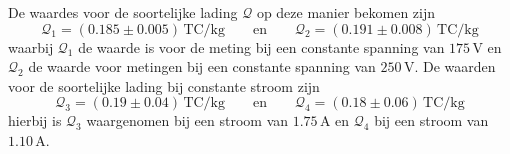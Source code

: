 De waardes voor de soortelijke lading $\mathcal{Q}$ op deze manier bekomen zijn
$$
\mathcal{Q}_1 = (0.185 \pm 0.005)\,\textrm{TC/kg}
\qquad \textrm{en} \qquad
\mathcal{Q}_2 = (0.191 \pm 0.008)\,\textrm{TC/kg}
$$
waarbij $\mathcal{Q}_1$ de waarde is voor de meting bij een constante spanning 
van $175$\,V en $\mathcal{Q}_2$ de waarde voor metingen bij een constante 
spanning van $250$\,V. De waarden voor de soortelijke lading bij constante 
stroom zijn
$$
\mathcal{Q}_3 = (0.19 \pm 0.04)\,\textrm{TC/kg}
\qquad \textrm{en} \qquad
\mathcal{Q}_4 = (0.18 \pm 0.06)\,\textrm{TC/kg}
$$
hierbij is $\mathcal{Q}_3$ waargenomen bij een stroom van $1.75$\,A en 
$\mathcal{Q}_4$ bij een stroom van $1.10$\,A.



